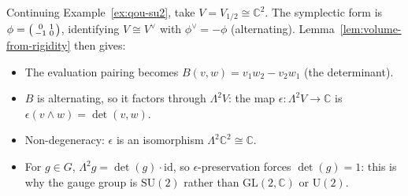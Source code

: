 \begin{example}
\label{ex:su2-volume-from-rigidity}
Continuing Example~\ref{ex:qou-su2}, take $V = V_{1/2} \cong \mathbb{C}^2$.
The symplectic form is
$\phi = \begin{psmallmatrix} 0 & 1 \\ -1 & 0 \end{psmallmatrix}$,
identifying $V \cong V^{\vee}$ with $\phi^{\vee} = -\phi$ (alternating).
Lemma~\ref{lem:volume-from-rigidity} then gives:
\begin{itemize}
  \item The evaluation pairing becomes
        $B(v, w) = v_1 w_2 - v_2 w_1$ (the determinant).
  \item $B$ is alternating, so it factors through $\Lambda^2 V$:
        the map $\epsilon \colon \Lambda^2 V \to \mathbb{C}$ is
        $\epsilon(v \wedge w) = \det(v, w)$.
  \item Non-degeneracy: $\epsilon$ is an isomorphism
        $\Lambda^2 \mathbb{C}^2 \cong \mathbb{C}$.
  \item For $g \in G$, $\Lambda^2 g = \det(g) \cdot \mathrm{id}$, so
        $\epsilon$-preservation forces $\det(g) = 1$: this is why the
        gauge group is $\mathrm{SU}(2)$ rather than
        $\mathrm{GL}(2, \mathbb{C})$ or $\mathrm{U}(2)$.
\end{itemize}
\end{example}

